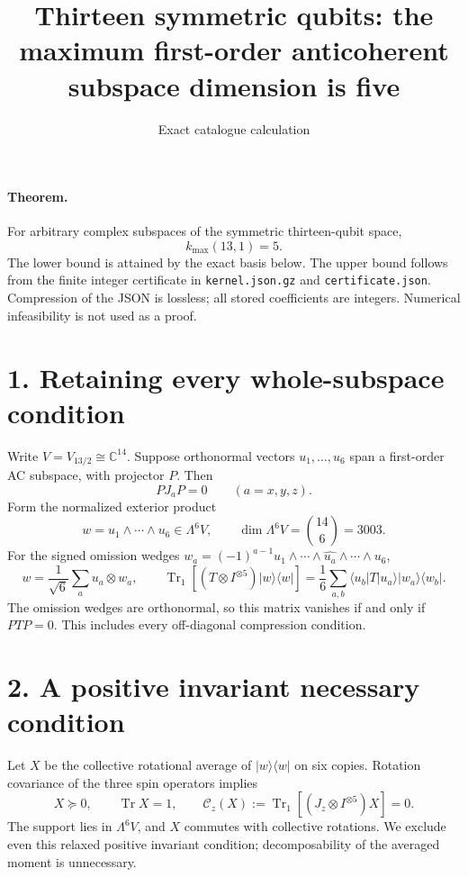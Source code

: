 \documentclass[11pt]{article}
\newcommand{\Tr}{\operatorname{Tr}}
\begin{document}
\title{Thirteen symmetric qubits: the maximum first-order anticoherent subspace dimension is five}
\author{Exact catalogue calculation}
\date{}
\maketitle
\paragraph{Theorem.} For arbitrary complex subspaces of the symmetric thirteen-qubit space,
\[
\boxed{k_{\max}(13,1)=5.}
\]
The lower bound is attained by the exact basis below. The upper bound follows from the finite integer certificate in \texttt{kernel.json.gz} and \texttt{certificate.json}. Compression of the JSON is lossless; all stored coefficients are integers. Numerical infeasibility is not used as a proof.

\section*{1. Retaining every whole-subspace condition}
Write $V=V_{13/2}\cong\mathbb C^{14}$. Suppose orthonormal vectors $u_1,\ldots,u_6$ span a first-order AC subspace, with projector $P$. Then
\[
PJ_aP=0\qquad(a=x,y,z).
\]
Form the normalized exterior product
\[
w=u_1\wedge\cdots\wedge u_6\in\Lambda^6V,\qquad
\dim\Lambda^6V=\binom{14}{6}=3003.
\]
For the signed omission wedges
$w_a=(-1)^{a-1}u_1\wedge\cdots\wedge\widehat{u_a}\wedge\cdots\wedge u_6$,
\[
w=\frac1{\sqrt6}\sum_a u_a\otimes w_a,
\qquad
\Tr_1[(T\otimes I^{\otimes5})|w\rangle\langle w|]
=\frac16\sum_{a,b}\langle u_b|T|u_a\rangle|w_a\rangle\langle w_b|.
\]
The omission wedges are orthonormal, so this matrix vanishes if and only if $PTP=0$. This includes every off-diagonal compression condition.

\section*{2. A positive invariant necessary condition}
Let $X$ be the collective rotational average of $|w\rangle\langle w|$ on six copies. Rotation covariance of the three spin operators implies
\[
X\succeq0,\qquad\Tr X=1,\qquad
\mathcal C_z(X):=\Tr_1[(J_z\otimes I^{\otimes5})X]=0.
\]
The support lies in $\Lambda^6V$, and $X$ commutes with collective rotations. We exclude even this relaxed positive invariant condition; decomposability of the averaged moment is unnecessary.
\end{document}
